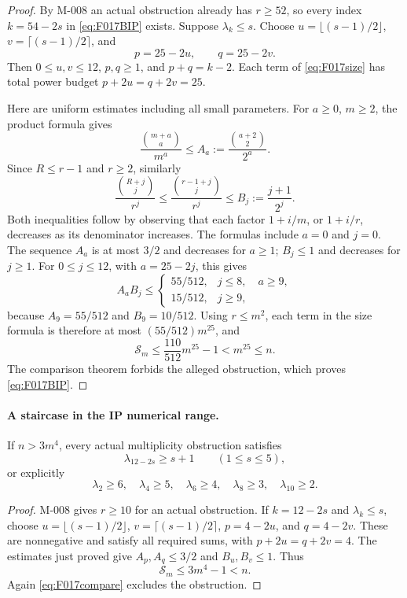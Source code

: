 \begin{proof}
By M-008 an actual obstruction already has \(r\geq52\),
so every index \(k=54-2s\) in \eqref{eq:F017BIP} exists.
Suppose \(\lambda_k\leq s\). Choose
\(u=\lfloor(s-1)/2\rfloor\),
\(v=\lceil(s-1)/2\rceil\), and
\[
                     p=25-2u,\qquad q=25-2v.
\]
Then \(0\leq u,v\leq12\), \(p,q\geq1\), and
\(p+q=k-2\). Each term of \eqref{eq:F017size}
has total power budget \(p+2u=q+2v=25\).

Here are uniform estimates including all small parameters.
For \(a\geq0\), \(m\geq2\), the product formula gives
\[
 \frac{\binom{m+a}{a}}{m^a}
       \leq A_a:=\frac{\binom{a+2}{2}}{2^a}.
\]
Since \(R\leq r-1\) and \(r\geq2\), similarly
\[
 \frac{\binom{R+j}{j}}{r^j}
       \leq\frac{\binom{r-1+j}{j}}{r^j}
       \leq B_j:=\frac{j+1}{2^j}.
\]
Both inequalities follow by observing that each factor
\(1+i/m\), or \(1+i/r\), decreases as its denominator
increases. The formulas include \(a=0\) and \(j=0\).
The sequence \(A_a\) is at most \(3/2\) and decreases
for \(a\geq1\); \(B_j\leq1\) and decreases for \(j\geq1\).
For \(0\leq j\leq12\), with \(a=25-2j\), this gives
\[
 A_a B_j\leq
 \begin{cases}
 55/512,&j\leq8,\quad a\geq9,\\
 15/512,&j\geq9,
 \end{cases}
\]
because \(A_9=55/512\) and \(B_9=10/512\).
Using \(r\leq m^2\), each term in the size formula is
therefore at most \((55/512)m^{25}\), and
\[
                 \mathcal S_m
                   \leq\frac{110}{512}m^{25}-1<m^{25}\leq n.
\]
The comparison theorem forbids the alleged obstruction,
which proves \eqref{eq:F017BIP}.
\end{proof}

\paragraph{A staircase in the IP numerical range.}
If \(n>3m^4\), every actual multiplicity obstruction satisfies
\begin{equation}\label{eq:F017IP}
              \lambda_{12-2s}\geq s+1
                                     \qquad(1\leq s\leq5),
\end{equation}
or explicitly
\[
       \lambda_2\geq6,\quad\lambda_4\geq5,\quad
       \lambda_6\geq4,\quad\lambda_8\geq3,\quad\lambda_{10}\geq2.
\]

\begin{proof}
M-008 gives \(r\geq10\) for an actual obstruction.
If \(k=12-2s\) and \(\lambda_k\leq s\), choose
\(u=\lfloor(s-1)/2\rfloor\),
\(v=\lceil(s-1)/2\rceil\),
\(p=4-2u\), and \(q=4-2v\).
These are nonnegative and satisfy all required sums,
with \(p+2u=q+2v=4\).
The estimates just proved give \(A_p,A_q\leq3/2\)
and \(B_u,B_v\leq1\). Thus
\[
                   \mathcal S_m\leq3m^4-1<n.
\]
Again \eqref{eq:F017compare} excludes the obstruction.
\end{proof}

